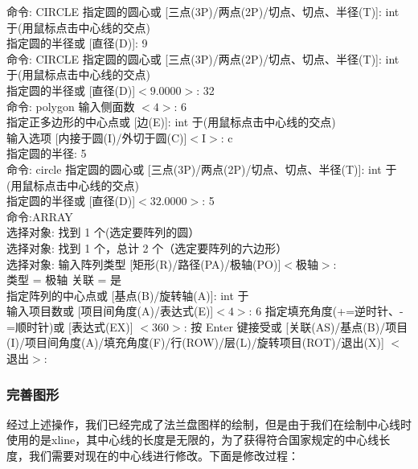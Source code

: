 \noindent
命令: CIRCLE 指定圆的圆心或 [三点(3P)/两点(2P)/切点、切点、半径(T)]: int 于(用鼠标点击中心线的交点)\\
指定圆的半径或 [直径(D)]: 9\\
命令:  CIRCLE 指定圆的圆心或 [三点(3P)/两点(2P)/切点、切点、半径(T)]: int 于(用鼠标点击中心线的交点)\\
指定圆的半径或 [直径(D)]$ <9.0000>$: 32\\
命令: polygon 输入侧面数 $<4>$: 6\\
指定正多边形的中心点或 [边(E)]: int 于(用鼠标点击中心线的交点)\\
输入选项 [内接于圆(I)/外切于圆(C)]$ <$I$>$: c\\
指定圆的半径: 5\\
命令: circle 指定圆的圆心或 [三点(3P)/两点(2P)/切点、切点、半径(T)]: int 于(用鼠标点击中心线的交点)\\
指定圆的半径或 [直径(D)]$ <32.0000>$: 5\\
命令:ARRAY\\
选择对象: 找到 1 个(选定要阵列的圆）\\
选择对象: 找到 1 个，总计 2 个（选定要阵列的六边形）\\
选择对象:  输入阵列类型 [矩形(R)/路径(PA)/极轴(PO)]$ <$极轴$>$:\\
类型 = 极轴  关联 = 是\\
指定阵列的中心点或 [基点(B)/旋转轴(A)]: int 于\\
输入项目数或 [项目间角度(A)/表达式(E)]$ <4>$: 6
指定填充角度(+=逆时针、-=顺时针)或 [表达式(EX)] $<360>$:
按 Enter 键接受或 [关联(AS)/基点(B)/项目(I)/项目间角度(A)/填充角度(F)/行(ROW)/层(L)/旋转项目(ROT)/退出(X)] 
$<$退出$>$:

\subsubsection{完善图形}
经过上述操作，我们已经完成了法兰盘图样的绘制，但是由于我们在绘制中心线时使用的是xline，其中心线的长度是无限的，为了获得符合国家规定的中心线长度，我们需要对现在的中心线进行修改。下面是修改过程：

\endinput
